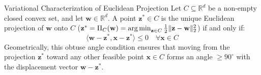 \begin{theorembox}{Variational Characterization of Euclidean Projection}
Let $C \subseteq \mathbb{R}^d$ be a non-empty closed convex set, and let $\mathbf{w} \in \mathbb{R}^d$. A point $\mathbf{z}^* \in C$ is the unique Euclidean projection of $\mathbf{w}$ onto $C$ ($\mathbf{z}^* = \Pi_C(\mathbf{w}) = \operatorname*{arg\,min}_{\mathbf{z} \in C} \frac{1}{2}\|\mathbf{z} - \mathbf{w}\|_2^2$) if and only if:
\begin{equation}
\langle \mathbf{w} - \mathbf{z}^*, \mathbf{x} - \mathbf{z}^* \rangle \le 0 \quad \forall \mathbf{x} \in C
\label{eq:proj_variational_char}
\end{equation}
Geometrically, this obtuse angle condition ensures that moving from the projection $\mathbf{z}^*$ toward any other feasible point $\mathbf{x} \in C$ forms an angle $\ge 90^\circ$ with the displacement vector $\mathbf{w} - \mathbf{z}^*$.
\end{theorembox}


